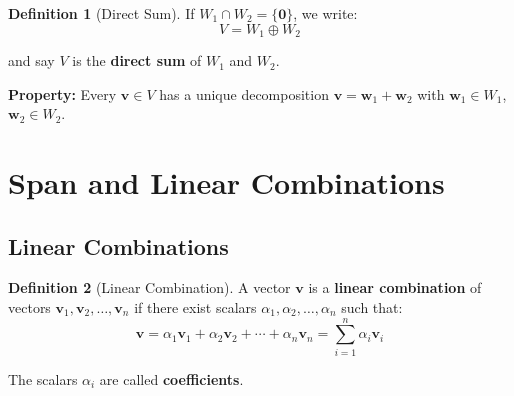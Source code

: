 \documentclass[12pt,a4paper]{article}
\theoremstyle{definition}
\newtheorem{definition}{Definition}[section]
\begin{document}
\begin{definition}[Direct Sum]
If $W_1 \cap W_2 = \{\mathbf{0}\}$, we write:
\begin{equation}
V = W_1 \oplus W_2
\end{equation}

and say $V$ is the \textbf{direct sum} of $W_1$ and $W_2$.

\textbf{Property:} Every $\mathbf{v} \in V$ has a unique decomposition $\mathbf{v} = \mathbf{w}_1 + \mathbf{w}_2$ with $\mathbf{w}_1 \in W_1$, $\mathbf{w}_2 \in W_2$.
\end{definition}

\section{Span and Linear Combinations}

\subsection{Linear Combinations}

\begin{definition}[Linear Combination]
A vector $\mathbf{v}$ is a \textbf{linear combination} of vectors $\mathbf{v}_1, \mathbf{v}_2, \ldots, \mathbf{v}_n$ if there exist scalars $\alpha_1, \alpha_2, \ldots, \alpha_n$ such that:
\begin{equation}
\mathbf{v} = \alpha_1\mathbf{v}_1 + \alpha_2\mathbf{v}_2 + \cdots + \alpha_n\mathbf{v}_n = \sum_{i=1}^n \alpha_i\mathbf{v}_i
\end{equation}

The scalars $\alpha_i$ are called \textbf{coefficients}.
\end{definition}
\end{document}
